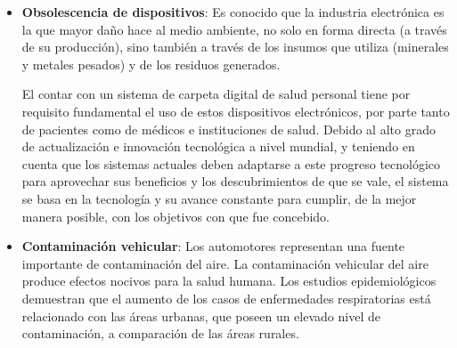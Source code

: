 {\begin{itemize}
    \begin{itemize}
        \item Se disminuiría el tiempo en la atención médica ligada a radiología por el rápido acceso de los médicos a las imágenes.
        El acceso a la imagen correcta en el punto de atención sería una constante.
        
        \item Se visualizarían todas las imágenes históricas tomadas al paciente.
        
        \item Aumentaría el ahorro de costos potenciales, ya que no se imprimirían placas.
        
        \item Se evitaría la pérdida de placas.
        
        \item Disminuirían las repeticiones y la exposición repetida a los rayos X, por parte de los pacientes.
    \end{itemize}
    
    
    \item \textbf{Obsolescencia de dispositivos}:
    Es conocido que la industria electrónica es la que mayor daño hace al medio ambiente, no solo en forma directa (a través de su producción), sino también a través de los insumos que utiliza (minerales y metales pesados) y de los residuos generados.
    
    El contar con un sistema de carpeta digital de salud personal tiene por requisito fundamental el uso de estos dispositivos electrónicos, por parte tanto de pacientes como de médicos e instituciones de salud.
    Debido al alto grado de actualización e innovación tecnológica a nivel mundial, y teniendo en cuenta que los sistemas actuales deben adaptarse a este progreso tecnológico para aprovechar sus beneficios y los descubrimientos de que se vale, el sistema se basa en la tecnología y su avance constante para cumplir, de la mejor manera posible, con los objetivos con que fue concebido.
    
    
    \item \textbf{Contaminación vehicular}:
    Los automotores representan una fuente importante de contaminación del aire.
    La contaminación vehicular del aire produce efectos nocivos para la salud humana.
    Los estudios epidemiológicos demuestran que el aumento de los casos de enfermedades respiratorias está relacionado con las áreas urbanas, que poseen un elevado nivel de contaminación, a comparación de las áreas rurales.
    

\end{itemize}}
